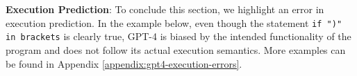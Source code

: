 








\textbf{Execution Prediction}: To conclude this section, we highlight an error in execution prediction. In the example below, even though the statement \texttt{if ")" in brackets} is clearly true, GPT-4 is biased by the intended functionality of the program and does not follow its actual execution semantics. More examples can be found in Appendix \ref{appendix:gpt4-execution-errors}.

